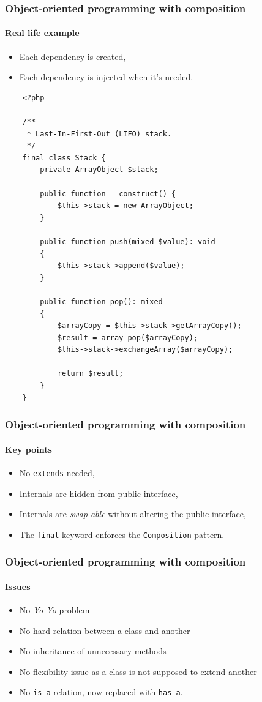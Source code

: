 \begin{frame}
    \frametitle{Object-oriented programming with composition}
    \framesubtitle{Real life example}

    \begin{itemize}[<+->]
        \item Each dependency is created,
        \item Each dependency is injected when it's needed.
    \end{itemize}
\end{frame}

\begin{frame}[fragile,c]
    \begin{lstlisting}
    <?php

    /**
     * Last-In-First-Out (LIFO) stack.
     */
    final class Stack {
        private ArrayObject $stack;

        public function __construct() {
            $this->stack = new ArrayObject;
        }

        public function push(mixed $value): void
        {
            $this->stack->append($value);
        }

        public function pop(): mixed
        {
            $arrayCopy = $this->stack->getArrayCopy();
            $result = array_pop($arrayCopy);
            $this->stack->exchangeArray($arrayCopy);

            return $result;
        }
    }
    \end{lstlisting}
\end{frame}

\begin{frame}
    \frametitle{Object-oriented programming with composition}
    \framesubtitle{Key points}

    \begin{itemize}[<+->]
        \item No \texttt{extends} needed,
        \item Internals are hidden from public interface,
        \item Internals are \textit{swap-able} without altering the public interface,
        \item The \texttt{final} keyword enforces the \texttt{Composition} pattern.
    \end{itemize}
\end{frame}

\begin{frame}
    \frametitle{Object-oriented programming with composition}
    \framesubtitle{Issues}

    \begin{itemize}[<+->]
        \item No \textit{Yo-Yo} problem
        \item No hard relation between a class and another
        \item No inheritance of unnecessary methods
        \item No flexibility issue as a class is not supposed to extend another
        \item No \texttt{is-a} relation, now replaced with \texttt{has-a}.
    \end{itemize}
\end{frame}

